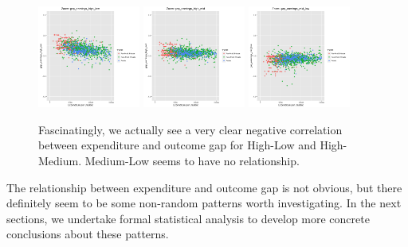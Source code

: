 \documentclass{article}
\begin{document}
\begin{figure}[H]
\centering
\includegraphics[width=0.3\textwidth]{../images/eda_scatterplots/gap_earnings_high_low_zoom.png}
\includegraphics[width=0.3\textwidth]{../images/eda_scatterplots/gap_earnings_high_mid_zoom.png}
\includegraphics[width=0.3\textwidth]{../images/eda_scatterplots/gap_earnings_mid_low_zoom.png}
\caption{\label{fig:Completion Rates} Fascinatingly, we actually see a very clear negative correlation between expenditure and outcome gap for High-Low and High-Medium. Medium-Low seems to have no relationship.}
\end{figure}

The relationship between expenditure and outcome gap is not obvious, but there definitely seem to be some non-random patterns worth investigating. In the next sections, we undertake formal statistical analysis to develop more concrete conclusions about these patterns.
\end{document}
